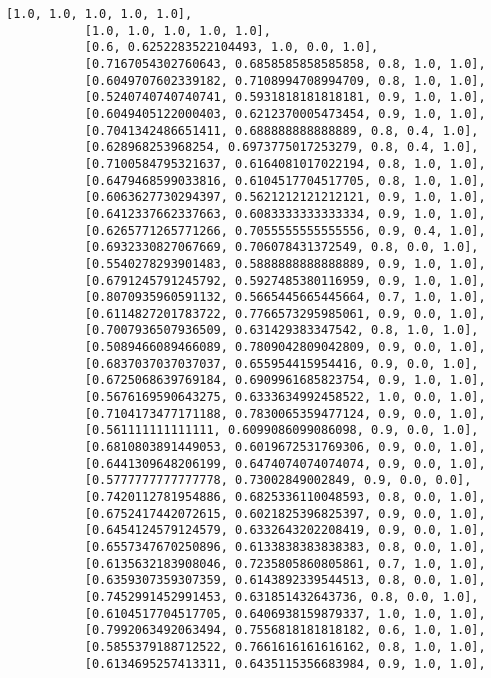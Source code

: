 \documentclass[11pt]{article}
\begin{document}
\begin{Verbatim}[commandchars=\\\{\}]
           [1.0, 1.0, 1.0, 1.0, 1.0],
           [1.0, 1.0, 1.0, 1.0, 1.0],
           [0.6, 0.6252283522104493, 1.0, 0.0, 1.0],
           [0.7167054302760643, 0.6858585858585858, 0.8, 1.0, 1.0],
           [0.6049707602339182, 0.7108994708994709, 0.8, 1.0, 1.0],
           [0.5240740740740741, 0.5931818181818181, 0.9, 1.0, 1.0],
           [0.6049405122000403, 0.6212370005473454, 0.9, 1.0, 1.0],
           [0.7041342486651411, 0.688888888888889, 0.8, 0.4, 1.0],
           [0.628968253968254, 0.6973775017253279, 0.8, 0.4, 1.0],
           [0.7100584795321637, 0.6164081017022194, 0.8, 1.0, 1.0],
           [0.6479468599033816, 0.6104517704517705, 0.8, 1.0, 1.0],
           [0.6063627730294397, 0.5621212121212121, 0.9, 1.0, 1.0],
           [0.6412337662337663, 0.6083333333333334, 0.9, 1.0, 1.0],
           [0.6265771265771266, 0.7055555555555556, 0.9, 0.4, 1.0],
           [0.6932330827067669, 0.706078431372549, 0.8, 0.0, 1.0],
           [0.5540278293901483, 0.5888888888888889, 0.9, 1.0, 1.0],
           [0.6791245791245792, 0.5927485380116959, 0.9, 1.0, 1.0],
           [0.8070935960591132, 0.5665445665445664, 0.7, 1.0, 1.0],
           [0.6114827201783722, 0.7766573295985061, 0.9, 0.0, 1.0],
           [0.7007936507936509, 0.631429383347542, 0.8, 1.0, 1.0],
           [0.5089466089466089, 0.7809042809042809, 0.9, 0.0, 1.0],
           [0.6837037037037037, 0.655954415954416, 0.9, 0.0, 1.0],
           [0.6725068639769184, 0.6909961685823754, 0.9, 1.0, 1.0],
           [0.5676169590643275, 0.6333634992458522, 1.0, 0.0, 1.0],
           [0.7104173477171188, 0.7830065359477124, 0.9, 0.0, 1.0],
           [0.561111111111111, 0.6099086099086098, 0.9, 0.0, 1.0],
           [0.6810803891449053, 0.6019672531769306, 0.9, 0.0, 1.0],
           [0.6441309648206199, 0.6474074074074074, 0.9, 0.0, 1.0],
           [0.5777777777777778, 0.73002849002849, 0.9, 0.0, 0.0],
           [0.7420112781954886, 0.6825336110048593, 0.8, 0.0, 1.0],
           [0.6752417442072615, 0.6021825396825397, 0.9, 0.0, 1.0],
           [0.6454124579124579, 0.6332643202208419, 0.9, 0.0, 1.0],
           [0.6557347670250896, 0.6133838383838383, 0.8, 0.0, 1.0],
           [0.6135632183908046, 0.7235805860805861, 0.7, 1.0, 1.0],
           [0.6359307359307359, 0.6143892339544513, 0.8, 0.0, 1.0],
           [0.7452991452991453, 0.631851432643736, 0.8, 0.0, 1.0],
           [0.6104517704517705, 0.6406938159879337, 1.0, 1.0, 1.0],
           [0.7992063492063494, 0.7556818181818182, 0.6, 1.0, 1.0],
           [0.5855379188712522, 0.7661616161616162, 0.8, 1.0, 1.0],
           [0.6134695257413311, 0.6435115356683984, 0.9, 1.0, 1.0],

\end{Verbatim}
\end{document}
